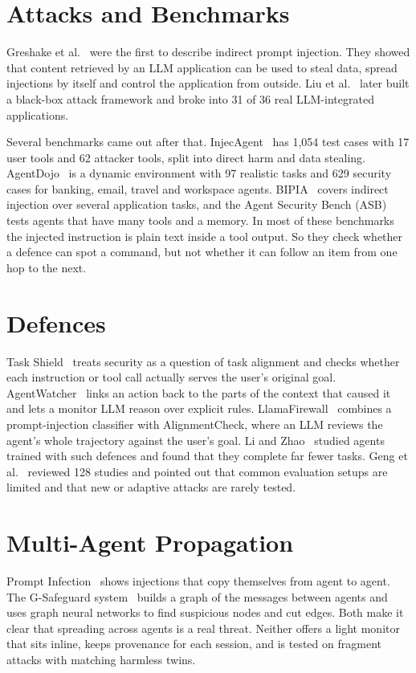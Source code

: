 \label{chap.2}
\section{Attacks and Benchmarks}
Greshake et al.~\cite{greshake2023} were the first to describe indirect prompt injection. They showed that content retrieved by an LLM application can be used to steal data, spread injections by itself and control the application from outside. Liu et al.~\cite{liu2023} later built a black-box attack framework and broke into 31 of 36 real LLM-integrated applications.

Several benchmarks came out after that. InjecAgent~\cite{zhan2024} has 1,054 test cases with 17 user tools and 62 attacker tools, split into direct harm and data stealing. AgentDojo~\cite{debenedetti2024} is a dynamic environment with 97 realistic tasks and 629 security cases for banking, email, travel and workspace agents. BIPIA~\cite{yi2023} covers indirect injection over several application tasks, and the Agent Security Bench (ASB)~\cite{zhang2024asb} tests agents that have many tools and a memory. In most of these benchmarks the injected instruction is plain text inside a tool output. So they check whether a defence can spot a command, but not whether it can follow an item from one hop to the next.

\section{Defences}
Task Shield~\cite{jia2024} treats security as a question of task alignment and checks whether each instruction or tool call actually serves the user's original goal. AgentWatcher~\cite{wang2026} links an action back to the parts of the context that caused it and lets a monitor LLM reason over explicit rules. LlamaFirewall~\cite{llamafirewall2025} combines a prompt-injection classifier with AlignmentCheck, where an LLM reviews the agent's whole trajectory against the user's goal. Li and Zhao~\cite{li2026} studied agents trained with such defences and found that they complete far fewer tasks. Geng et al.~\cite{geng2026} reviewed 128 studies and pointed out that common evaluation setups are limited and that new or adaptive attacks are rarely tested.

\section{Multi-Agent Propagation}
Prompt Infection~\cite{lee2024} shows injections that copy themselves from agent to agent. The G-Safeguard system~\cite{gsafeguard2025} builds a graph of the messages between agents and uses graph neural networks to find suspicious nodes and cut edges. Both make it clear that spreading across agents is a real threat. Neither offers a light monitor that sits inline, keeps provenance for each session, and is tested on fragment attacks with matching harmless twins.

